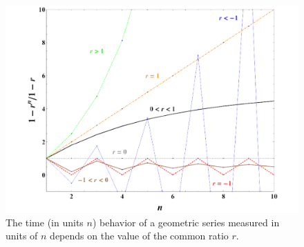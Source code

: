 \documentclass[aps,rmp,preprint,amsfonts,showpacs,showkeys]{revtex4}
\begin{document}
\begin{figure}
\begin{center}
 \includegraphics[width=120mm]{2008-mm-gs}
\end{center}
\caption{The time (in units $n$)  behavior of a geometric series measured in units of $n$ depends on the value of the common ratio $r$.}
\label{2008-mm-gs}
\end{figure}





%
%
%
%
\end{document}
